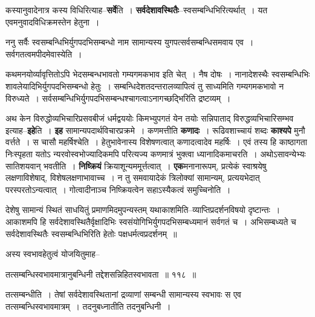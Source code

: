 \documentclass[article,12pt,a4paper]{memoir}
\begin{document}
	  \pstart कस्यानुवादेनात्र कस्य विधिरित्या\leavevmode{}ह--\textbf{सर्वे}ति । \textbf{सर्वदेशावस्थितैः}--स्वसम्बन्धिभिरित्यर्थात् । यत एवमनुवादविधिक्रमस्तेन हेतुना ।
	\pend
      

	  \pstart ननु सर्वैः स्वसम्बन्धिभिर्युगपदभिसम्बन्धो नाम सामान्यस्य युगपत्सर्वसम्बन्धिसमवाय एव । सर्वगतत्वमपीदमेवास्येति ।
	\pend
      

	  \pstart कथमनयोर्व्यावृत्तितोऽपि भेदसम्बन्धभावतो गम्यगमकभाव इति चेत् । नैष दोषः । नानादेशस्थैः स्वसम्बन्धिभिः शावलेयादिभिर्युगपदभिसम्बन्धो हेतुः । सम्बन्धिदेशतदन्तरालव्यापित्वं तु साध्यमिति गम्यगमकभावो न विरुध्यते । सर्वसम्बन्धिभिर्युगपदभिसम्बन्धश्चागत्वाऽनागच्छद्भिरिति द्रष्टव्यम् ।
	\pend
      

	  \pstart अथ केन विरुद्धोव्यभिचारिप्रसवबीजं धर्मद्वययोः किमभ्युपगतं येन तयोः सन्निपाताद् विरुद्धव्यभिचारिसम्भव इत्याह--\textbf{इहे}ति । \textbf{इह} सामान्यपदार्थविचारप्रक्रमे । कणमत्तीति \textbf{कणादः} । रूढिवशाच्चायं शब्दः \textbf{काश्यपे} मुनौ वर्त्तते । स चासौ महर्षिश्चेति । हेतुभावेनास्य विशेषणत्वात् कणादत्वादेव महर्षिः । एवं तस्य हि काष्ठागता निःस्पृहता यतोऽ न्यरवोस्वभोज्यादिकमपि परित्यज्य कणमात्रं भुक्त्वा ध्यानादिकमाचरति । अथोऽसावन्येभ्यः सातिशयवान् भवतीति । \textbf{निष्क्रियं} क्रियाशून्यममूर्त्तत्वात् । \textbf{एक}मनानारूपम्, प्रत्येकं स्वाश्रयेषु लक्षणाविशेषाद्, विशेषलक्षणाभावाच्च । न तु समवायादेकं त्रिलोक्यां सामान्यम्, प्रत्ययभेदात् परस्परतोऽन्यत्वात् । गोत्वादीनाञ्च निष्क्रियत्वेन सहाऽस्यैकत्वं समुच्चिनोति ।  \leavevmode{} 
	  
	देशेषु सामान्यं स्थितं साधयितुं प्रमाणमिदमुपन्यस्तम् यथाकाशमिति--व्याप्तिप्रदर्शनविषयो दृष्टान्तः । आकाशमपि हि सर्वदेशावस्थितैर्वृक्षादिभिः स्वसंयोगिभिर्युगपदभिसम्बध्यमानं सर्वगतं च । अभिसम्बध्यते च सर्वदेशावस्थितैः स्वसम्बन्धिभिरिति हेतोः पक्षधर्मत्वप्रदर्शनम् ॥  
	  
	अस्य स्वभावहेतुत्वं योजयितुमाह--  
	  
	तत्सम्बन्धिस्वभावमात्रानुबन्धिनी तद्देशसन्निहितस्वभावता ॥ ११८ ॥ 
	  
	तत्सम्बन्धीति । तेषां सर्वदेशावस्थितानां द्रव्याणां सम्बन्धी सामान्यस्य स्वभावः स एव तत्सम्बन्धिस्वभावमात्रम् । तदनुबध्नातीति तदनुबन्धिनी ।  
	  
\end{document}
